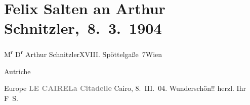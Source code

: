 

         
         \renewcommand{\erwaehntePersonen}{Personen: Felix Salten}
         \renewcommand{\erwaehnteOrte}{Orte: Edmund-Weiß-Gasse 7, Kairo, Wien, XVIII., Währing, Zitadelle von Saladin, Österreich}
         \renewcommand{\erwaehnteWerke}{}
               \section[ Felix Salten an Arthur Schnitzler, 8. 3. 1904]{ Felix Salten an Arthur Schnitzler, 8. 3. 1904}\nopagebreak{}\rehead{ }\begin{ledgroupsized}[t]{13cm}\normalsize\beginnumbering \toendnotes[C]{\smallbreak\pagebreak[2]} 
\pstart{}{\pb}M\textsuperscript{r} D\textsuperscript{r} Arthur Schnitzler\pend{}\pstart{}XVIII. Spöttelgaße 7\pend{}\pstart{}Wien\pend{}\pstart{}\begin{otherlanguage}{french}Autriche\end{otherlanguage}\pend{}\pstart{}Europe\pend{}{\bigskip}\pstart
           \noindent{}{\pb}\textcolor{gray}{\textbf{LE CAIRE}}\hfill \textcolor{gray}{\textbf{La Citadelle}}\pend
           \pstart
           Cairo, 8. III. 04.\pend
           \pstart
           Wunderschön!! herzl. Ihr \spacefill\mbox{F S.}\pend
           
         
         \endnumbering{}\end{ledgroupsized}  \newcommand{\dateiname}{L03393}\newcommand{\titel}{Felix Salten an Arthur Schnitzler, 8. 3. 1904}\newcommand{\editorInnen}{Martin Anton Müller und Laura Untner}
      